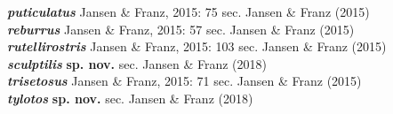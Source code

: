 \documentclass[fleqn,10pt,lineno]{wlpeerj} %
\begin{document}
\begin{tabbing}
			\> \textbf{\textit{puticulatus}} Jansen \& Franz, 2015: 75 sec. Jansen \& Franz (2015)\\
			\> \textbf{\textit{reburrus}} Jansen \& Franz, 2015: 57 sec. Jansen \& Franz (2015)\\
			\> \textbf{\textit{rutellirostris}} Jansen \& Franz, 2015: 103 sec. Jansen \& Franz (2015)\\
			\> \textbf{\textit{sculptilis}} \textbf{sp. nov.} sec. Jansen \& Franz (2018)\\
			\> \textbf{\textit{trisetosus}} Jansen \& Franz, 2015: 71 sec. Jansen \& Franz (2015)\\
			\> \textbf{\textit{tylotos}} \textbf{sp. nov.} sec. Jansen \& Franz (2018)\\
	\end{tabbing}

\newpage
\end{document}

